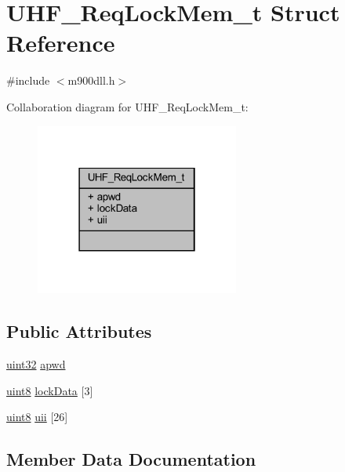 \hypertarget{struct_u_h_f___req_lock_mem__t}{}\section{U\+H\+F\+\_\+\+Req\+Lock\+Mem\+\_\+t Struct Reference}
\label{struct_u_h_f___req_lock_mem__t}


{\ttfamily \#include $<$m900dll.\+h$>$}



Collaboration diagram for U\+H\+F\+\_\+\+Req\+Lock\+Mem\+\_\+t\+:
\nopagebreak
\begin{figure}[H]
\begin{center}
\leavevmode
\includegraphics[width=190pt]{struct_u_h_f___req_lock_mem__t__coll__graph}
\end{center}
\end{figure}
\subsection*{Public Attributes}
\begin{DoxyCompactItemize}
\item 
\mbox{\hyperlink{m900dll_8h_a4b435a49c74bb91f284f075e63416cb6}{uint32}} \mbox{\hyperlink{struct_u_h_f___req_lock_mem__t_af3d585b9b17dba97db7f2543b40bc416}{apwd}}
\item 
\mbox{\hyperlink{m900dll_8h_adde6aaee8457bee49c2a92621fe22b79}{uint8}} \mbox{\hyperlink{struct_u_h_f___req_lock_mem__t_a1dc5ffb774a7af9d377c1d7252fa0943}{lock\+Data}} \mbox{[}3\mbox{]}
\item 
\mbox{\hyperlink{m900dll_8h_adde6aaee8457bee49c2a92621fe22b79}{uint8}} \mbox{\hyperlink{struct_u_h_f___req_lock_mem__t_aad7c2df7bf085de7cc90e2b4d36a2f48}{uii}} \mbox{[}26\mbox{]}
\end{DoxyCompactItemize}


\subsection{Member Data Documentation}
\mbox{\label{struct_u_h_f___req_lock_mem__t_af3d585b9b17dba97db7f2543b40bc416}} 
